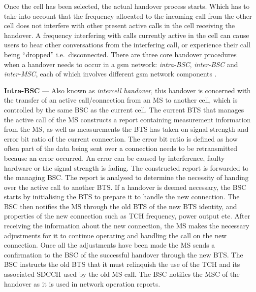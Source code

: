 Once the cell has been selected, the actual handover process starts. Which has to take into account that the frequency allocated to the incoming call from the other cell does not interfere with other present active calls in the cell receiving the handover\cite{Eisenblatter,GSMArchitectureProtocolsServices,wirelesstelcoMullet}. A frequency interfering with calls currently active in the cell can cause users to hear other conversations from the interfering call, or experience their call being ``dropped'' i.e.\ disconnected\cite{Eisenblatter}. 
There are three core handover procedures when a handover needs to occur in a \gls{gsm} network: \emph{intra-BSC}, \emph{inter-BSC} and \emph{inter-MSC}, each of which involves different \gls{gsm} network components \cite{wirelesstelcoMullet}.

\begin{description}
\item{\textbf{Intra-BSC}} --- Also known as \emph{intercell handover}, this handover is concerned with the transfer of an active call/connection from an \gls{MS} to another cell, which is controlled by the same \gls{BSC} as the current cell\cite{wirelesstelcoMullet,GSMArchitectureProtocolsServices}. The current \gls{BTS} that manages the active call of the \gls{MS} constructs a report containing measurement information from the MS, as well as measurements the \gls{BTS} has taken on signal strength and error bit ratio of the current connection\cite{wirelesstelcoMullet,GSMArchitectureProtocolsServices}. The error bit ratio is defined as how often part of the data being sent over a connection needs to be retransmitted because an error occurred\cite{wirelesstelcoMullet,GSMArchitectureProtocolsServices}. An error can be caused by interference, faulty hardware or the signal strength is fading\cite{wirelesstelcoMullet,GSMArchitectureProtocolsServices}. The constructed report is forwarded to the managing \gls{BSC}. The report is analysed to determine the necessity of handing over the active call to another \gls{BTS}\@. If a handover is deemed necessary, the \gls{BSC} starts by initialising the \gls{BTS} to prepare it to handle the new connection\cite{wirelesstelcoMullet,GSMArchitectureProtocolsServices}. The \gls{BSC} then notifies the \gls{MS} through the old \gls{BTS} of the new \gls{BTS} identity, and properties of the new connection such as \gls{TCH} frequency, power output etc. After receiving the information about the new connection, the \gls{MS} makes the necessary adjustments for it to continue operating and handling the call on the new connection\cite{wirelesstelcoMullet,GSMArchitectureProtocolsServices}. Once all the adjustments have been made the \gls{MS} sends a confirmation to the \gls{BSC} of the successful handover through the new \gls{BTS}\@. The \gls{BSC} instructs the old \gls{BTS} that it must relinquish the use of the \gls{TCH} and its associated \gls{SDCCH} used by the old \gls{MS} call. The \gls{BSC} notifies the \gls{MSC} of the handover as it is used in network operation reports\cite{wirelesstelcoMullet,GSMArchitectureProtocolsServices}.

\end{description}
